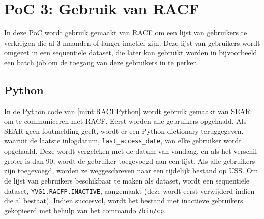     
    

\section{PoC 3: Gebruik van RACF}
In deze PoC wordt gebruik gemaakt van RACF om een lijst van gebruikers te verkrijgen die al 3 maanden of langer inactief zijn. Deze lijst van gebruikers wordt omgezet in een sequentiële dataset, die later kan gebruikt worden in bijvoorbeeld een batch job om de toegang van deze gebruikers in te perken.
 
\subsection{Python}
In de Python code van \ref{mint:RACFPython} wordt gebruik gemaakt van SEAR om te communiceren met RACF. Eerst worden alle gebruikers opgehaald. Als SEAR geen foutmelding geeft, wordt er een Python dictionary teruggegeven, waaruit de laatste inlogdatum, \texttt{last\_access\_date}, van elke gebruiker wordt opgehaald. Deze wordt vergeleken met de datum van vandaag, en als het verschil groter is dan 90, wordt de gebruiker toegevoegd aan een lijst. Als alle gebruikers zijn toegevoegd, worden ze weggeschreven naar een tijdelijk bestand op USS. Om de lijst van gebruikers beschikbaar te maken als dataset, wordt een sequentiële dataset, \texttt{YVG1.RACFP.INACTIVE}, aangemaakt (deze wordt eerst verwijderd indien die al bestaat). Indien succesvol, wordt het bestand met inactieve gebruikers gekopieerd met behulp van het commando \texttt{/bin/cp}.

